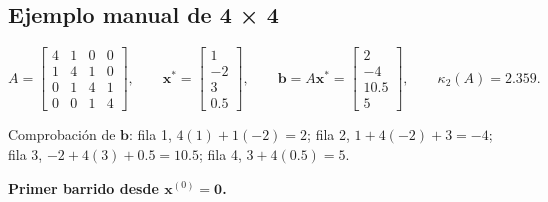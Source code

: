 \documentclass[
  11pt,
  letterpaper,
]{article}
\begin{document}
\hypertarget{manual}{%
\subsection{Ejemplo manual de 4 × 4}\label{manual}}

\[A=\begin{bmatrix}4&1&0&0\\1&4&1&0\\0&1&4&1\\0&0&1&4\end{bmatrix},\qquad \mathbf{x}^{*}=\begin{bmatrix}1\\-2\\3\\0.5\end{bmatrix},\qquad \mathbf{b}=A\mathbf{x}^{*}=\begin{bmatrix}2\\-4\\10.5\\5\end{bmatrix},\qquad \kappa_2(A)=2.359 .\]

Comprobación de \(\mathbf{b}\): fila 1, \(4(1)+1(-2)=2\); fila 2,
\(1+4(-2)+3=-4\); fila 3, \(-2+4(3)+0.5=10.5\); fila 4, \(3+4(0.5)=5\).

\textbf{Primer barrido desde \(\mathbf{x}^{(0)}=\mathbf{0}\).}
\end{document}
